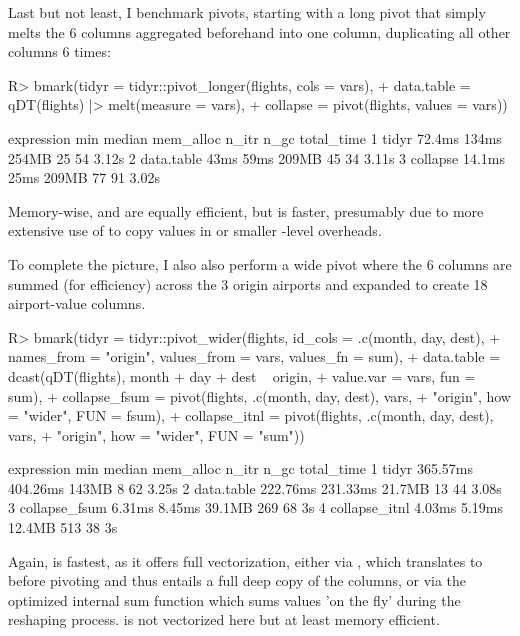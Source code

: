 \documentclass[article]{jss} %
\newcommand{\fct}[1]{\code{#1()}}
\begin{document}
Last but not least, I benchmark pivots, starting with a long pivot that simply melts the 6 columns aggregated beforehand into one column, duplicating all other columns 6 times:
%
\begin{Schunk}
\begin{Sinput}
R> bmark(tidyr = tidyr::pivot_longer(flights, cols = vars),
+        data.table = qDT(flights) |> melt(measure = vars),
+        collapse = pivot(flights, values = vars))
\end{Sinput}
\begin{Soutput}
  expression    min median mem_alloc n_itr n_gc total_time
1      tidyr 72.4ms  134ms     254MB    25   54      3.12s
2 data.table   43ms   59ms     209MB    45   34      3.11s
3   collapse 14.1ms   25ms     209MB    77   91      3.02s
\end{Soutput}
\end{Schunk}
%
Memory-wise,  and  are equally efficient, but  is faster, presumably due to more extensive use of  to copy values in  or smaller -level overheads.

To complete the picture, I also also perform a wide pivot where the 6 columns are summed (for efficiency) across the 3 origin airports and expanded to create 18 airport-value columns.
%
\begin{Schunk}
\begin{Sinput}
R> bmark(tidyr = tidyr::pivot_wider(flights, id_cols = .c(month, day, dest),
+            names_from = "origin", values_from = vars, values_fn = sum),
+        data.table = dcast(qDT(flights), month + day + dest ~ origin,
+                           value.var = vars, fun = sum),
+        collapse_fsum = pivot(flights, .c(month, day, dest), vars,
+                              "origin", how = "wider", FUN = fsum),
+        collapse_itnl = pivot(flights, .c(month, day, dest), vars,
+                              "origin", how = "wider", FUN = "sum"))
\end{Sinput}
\begin{Soutput}
     expression      min   median mem_alloc n_itr n_gc total_time
1         tidyr 365.57ms 404.26ms     143MB     8   62      3.25s
2    data.table 222.76ms 231.33ms    21.7MB    13   44      3.08s
3 collapse_fsum   6.31ms   8.45ms    39.1MB   269   68         3s
4 collapse_itnl   4.03ms   5.19ms    12.4MB   513   38         3s
\end{Soutput}
\end{Schunk}
%
Again,  is fastest, as it offers full vectorization, either via \fct{fsum}, which translates to  before pivoting and thus entails a full deep copy of the  columns, or via the optimized internal sum function which sums values 'on the fly' during the reshaping process.  is not vectorized here but at least memory efficient. %
\end{document}
